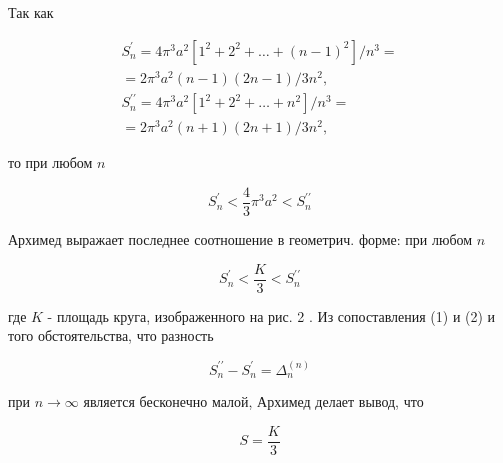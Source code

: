 \documentclass[10pt]{article}
\begin{document}
Так как



\[

\begin{gathered}

S_{n}^{\prime}=4 \pi^{3} a^{2}\left[1^{2}+2^{2}+\ldots+(n-1)^{2}\right] / n^{3}= \\

=2 \pi^{3} a^{2}(n-1)(2 n-1) / 3 n^{2}, \\

S_{n}^{\prime \prime}=4 \pi^{3} a^{2}\left[1^{2}+2^{2}+\ldots+n^{2}\right] / n^{3}= \\

=2 \pi^{3} a^{2}(n+1)(2 n+1) / 3 n^{2},

\end{gathered}

\]



то при любом $n$



\[

S_{n}^{\prime}<\frac{4}{3} \pi^{3} a^{2}<S_{n}^{\prime \prime}

\]



Архимед выражает последнее соотношение в геометрич. форме: при любом $n$



\[

S_{n}^{\prime}<\frac{K}{3}<S_{n}^{\prime \prime}

\]



где $K$ - площадь круга, изображенного на рис. 2 . Из сопоставления (1) и (2) и того обстоятельства, что разность



\[

S_{n}^{\prime \prime}-S_{n}^{\prime}=\Delta_{n}^{(n)}

\]



при $n \rightarrow \infty$ является бесконечно малой, Архимед делает вывод, что



\[

S=\frac{K}{3}

\]
\end{document}
